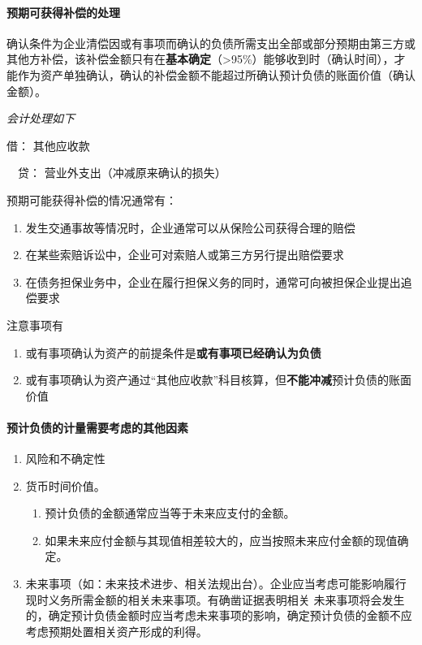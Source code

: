 \documentclass[UTF8,12pt]{ctexart}
\newenvironment{Dr}{\noindent 借：}{\par}
\newenvironment{Cr}{\noindent \ \ 贷：}{\par}
\numberwithin{equation}{section} %
\numberwithin{figure}{section}
\numberwithin{table}{section}
\begin{document}
	
	\paragraph{预期可获得补偿的处理}
	确认条件为企业清偿因或有事项而确认的负债所需支出全部或部分预期由第三方或其他方补偿，该补偿金额只有在\textbf{基本确定}（>95\%）能够收到时（确认时间），才能作为资产单独确认，确认的补偿金额不能超过所确认预计负债的账面价值（确认金额）。
	
	\textit{会计处理如下}
	
	\begin{Dr}
		其他应收款
	\end{Dr}
	\begin{Cr}
		营业外支出（冲减原来确认的损失）
	\end{Cr}
	
	预期可能获得补偿的情况通常有：
	\begin{enumerate}
		\item 发生交通事故等情况时，企业通常可以从保险公司获得合理的赔偿
		
		\item 在某些索赔诉讼中，企业可对索赔人或第三方另行提出赔偿要求
		
		\item 在债务担保业务中，企业在履行担保义务的同时，通常可向被担保企业提出追偿要求
	\end{enumerate}
	
	注意事项有
	\begin{enumerate}
		\item 或有事项确认为资产的前提条件是\textbf{或有事项已经确认为负债}
		
		\item 或有事项确认为资产通过“其他应收款”科目核算，但\textbf{不能冲减}预计负债的账面价值
	\end{enumerate}
	
	\paragraph{预计负债的计量需要考虑的其他因素}
	\begin{enumerate}
		\item 风险和不确定性
		
		\item 货币时间价值。
		\begin{enumerate}
			\item 预计负债的金额通常应当等于未来应支付的金额。
			
			\item 如果未来应付金额与其现值相差较大的，应当按照未来应付金额的现值确定。
		\end{enumerate}
		
		\item 未来事项（如：未来技术进步、相关法规出台）。企业应当考虑可能影响履行现时义务所需金额的相关未来事项。有确凿证据表明相关  未来事项将会发生的，确定预计负债金额时应当考虑未来事项的影响，确定预计负债的金额不应考虑预期处置相关资产形成的利得。
	\end{enumerate}
	
\end{document}
